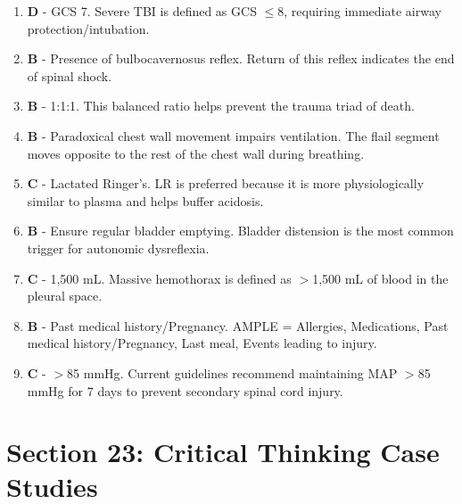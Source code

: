 \documentclass[11pt]{article}
\begin{document}
\begin{enumerate}
    \item \textbf{D} - GCS 7. Severe TBI is defined as GCS $\leq$8, requiring immediate airway protection/intubation.
    
    \item \textbf{B} - Presence of bulbocavernosus reflex. Return of this reflex indicates the end of spinal shock.
    
    \item \textbf{B} - 1:1:1. This balanced ratio helps prevent the trauma triad of death.
    
    \item \textbf{B} - Paradoxical chest wall movement impairs ventilation. The flail segment moves opposite to the rest of the chest wall during breathing.
    
    \item \textbf{C} - Lactated Ringer's. LR is preferred because it is more physiologically similar to plasma and helps buffer acidosis.
    
    \item \textbf{B} - Ensure regular bladder emptying. Bladder distension is the most common trigger for autonomic dysreflexia.
    
    \item \textbf{C} - 1,500 mL. Massive hemothorax is defined as $>$1,500 mL of blood in the pleural space.
    
    \item \textbf{B} - Past medical history/Pregnancy. AMPLE = Allergies, Medications, Past medical history/Pregnancy, Last meal, Events leading to injury.
    
    \item \textbf{C} - $>$85 mmHg. Current guidelines recommend maintaining MAP $>$85 mmHg for 7 days to prevent secondary spinal cord injury.
\end{enumerate}

\newpage
\section*{Section 23: Critical Thinking Case Studies}
\end{document}
